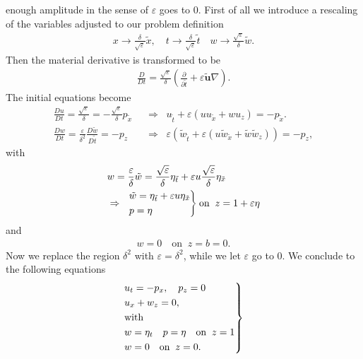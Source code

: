 enough amplitude in the sense of $\varepsilon$ goes to $0$. First of all we
introduce a rescaling of the variables adjusted to our problem definition
\begin{align}\label{eq:epsdelta}
    x \rightarrow \frac{\delta}{\sqrt{\varepsilon} }\tilde{x}, \quad t
    \rightarrow \frac{\delta}{\sqrt{\varepsilon} }\tilde{t}\quad
    w \rightarrow \frac{\sqrt{\varepsilon} }{\delta}\tilde{w}.
\end{align}
Then the material derivative is transformed to be
\begin{align}
    \frac{D}{Dt} = \frac{\sqrt{\varepsilon}}{\delta}(\frac{\partial
    }{\partial \tilde{t}} +\varepsilon \tilde{\mathbf{u}} \nabla).
\end{align}
The initial equations become
\begin{align}
    \frac{Du}{Dt} = \frac{\sqrt{\varepsilon}}{\delta} =-
    \frac{\sqrt{\varepsilon} }{\delta} p_{\tilde{x}}\;\; &\Rightarrow\;\;
    u_{\tilde{t}} + \varepsilon(u u_{\tilde{x}} + wu_z)= -p_{\tilde{x}}.\\
    \frac{Dw}{Dt} = \frac{\varepsilon}{\delta^2}
    \frac{D\tilde{w}}{D\tilde{t}}=-p_z \;\;&\Rightarrow\;\;
    \varepsilon\left(\tilde{w}_{\tilde{t}} + \varepsilon\left(
    u\tilde{w}_{\tilde{x}}+ \tilde{w}\tilde{w}_z \right)   \right)  = -p_z,
\end{align}
with
\begin{align}
    &w
    = \frac{\varepsilon}{\delta}\tilde{w}
    = \frac{\sqrt{\varepsilon} }{\delta}
    \eta_{\tilde{t}}+\varepsilon u\frac{\sqrt{\varepsilon}}{\delta}
    \eta_{\tilde{x}}\\
    &\Rightarrow\;\;
    \begin{drcases}
    \tilde{w} = \eta_{\tilde{t}}+ \varepsilon u
    \eta_{\tilde{x}}\\
    p=\eta
    \end{drcases}
    \text{on}\;\; z = 1+\varepsilon\eta
\end{align}
and
\begin{align}
    w = 0 \quad \text{on}\;\; z= b = 0.
\end{align}
Now we replace the region $\delta^2$ with $\varepsilon = \delta^2$, while we
let $\varepsilon$ go to $0$. We conclude to the following equations
\begin{align}\label{eq:kdv3}
    \begin{drcases}
    u_t = -p_x, \quad p_z = 0\\
    u_x + w_z = 0,\\
    \text{with}\\
    w=\eta_t \quad p=\eta \quad \text{on}\;\; z= 1\\
    w = 0 \quad \text{on}\;\; z= 0.
    \end{drcases}
\end{align}
